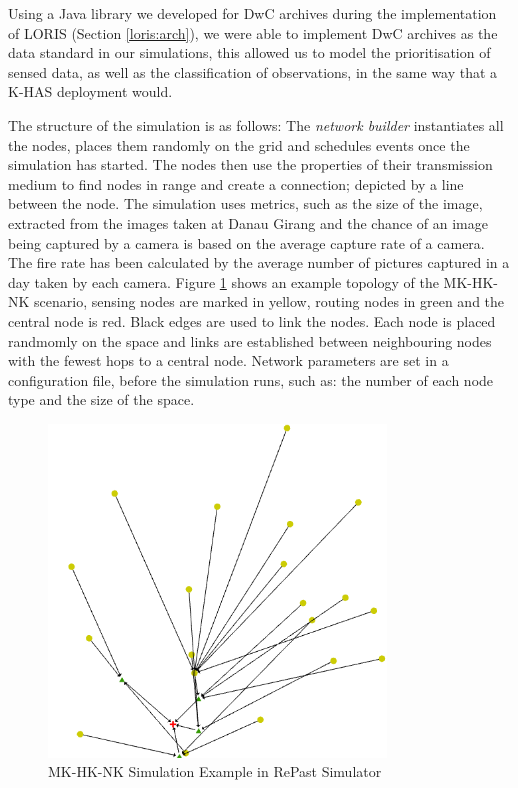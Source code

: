 Using a Java library we developed for DwC archives during the implementation of LORIS (Section \ref{loris:arch}), we were able to implement DwC archives as the data standard in our simulations, this allowed us to model the prioritisation of sensed data, as well as the classification of observations, in the same way that a K-HAS deployment would.

The structure of the simulation is as follows: The \textit{network builder} instantiates all the nodes, places them randomly on the grid and schedules events once the simulation has started. The nodes then use the properties of their transmission medium to find nodes in range and create a connection; depicted by a line between the node. The simulation uses metrics, such as the size of the image, extracted from the images taken at Danau Girang and the chance of an image being captured by a camera is based on the average capture rate of a camera. The fire rate has been calculated by the average number of pictures captured in a day taken by each camera. Figure \ref{fig:sim} shows an example topology of the MK-HK-NK scenario, sensing nodes are marked in yellow, routing nodes in green and the central node is red. Black edges are used to link the nodes. Each node is placed randmomly on the space and links are established between neighbouring nodes with the fewest hops to a central node. Network parameters are set in a configuration file, before the simulation runs, such as: the number of each node type and the size of the space.


	\begin{figure}[h]
	\centering
	\includegraphics[width=0.8\textwidth]{Chap7/figures/khas_sim}
	\caption{MK-HK-NK Simulation Example in RePast Simulator}
	\label{fig:sim}
	\end{figure}

